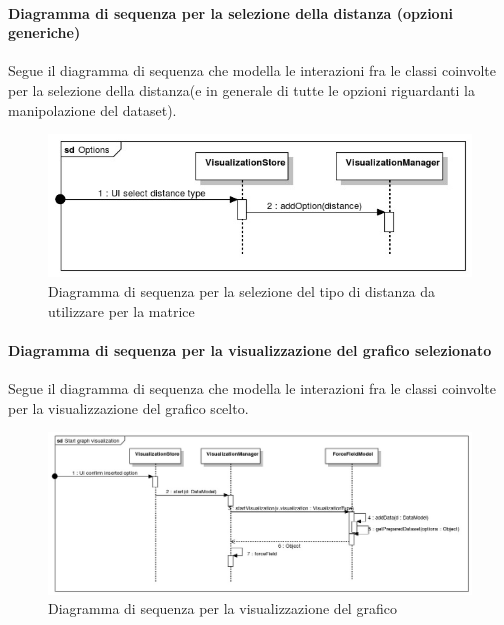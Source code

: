         \paragraph{Diagramma di sequenza per la selezione della distanza (opzioni generiche)}
        Segue il diagramma di sequenza che modella le interazioni fra le classi coinvolte per la selezione della distanza(e in generale di tutte le opzioni riguardanti la manipolazione del dataset).
        \begin{figure}[H]
                \centering\includegraphics[width=1\textwidth]{source/img/sequenza4.jpeg}
                \caption{Diagramma di sequenza per la selezione del tipo di distanza da utilizzare per la matrice}
        \end{figure}
        
        \paragraph{Diagramma di sequenza per la visualizzazione del grafico selezionato}
        Segue il diagramma di sequenza che modella le interazioni fra le classi coinvolte per la visualizzazione del grafico scelto.
        \begin{figure}[H]
                \centering\includegraphics[width=1\textwidth]{source/img/sequenza5.jpeg}
                \caption{Diagramma di sequenza per la visualizzazione del grafico}
            \end{figure}
        
        
